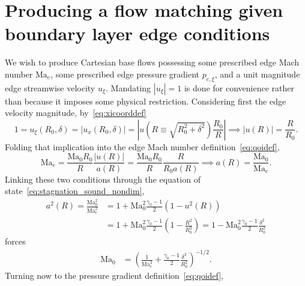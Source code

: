 \documentclass[letterpaper,11pt,nointlimits,reqno]{amsart}
\newcommand{\Mach}[1][]{\mbox{Ma}_{#1}}
\begin{document}
\section{Producing a flow matching given boundary layer edge conditions}

We wish to produce Cartesian base flows possessing some prescribed edge Mach
number $\Mach[e]{}$, some prescribed edge pressure gradient $p_{e,\xi}$, and a
unit magnitude edge streamwise velocity $u_\xi$.
%
Mandating $\left|u_\xi\right|=1$ is done for convenience rather than because it
imposes some physical restriction.
%
Considering first the edge velocity magnitude,
by~\eqref{eq:xicoorddef}
\begin{equation}
    1
    = u_\xi\!\left(R_0, \delta\right)
    = \left|u_x\!\left(R_0,\delta\right) \right|
    = \left|u  \!\left(R\equiv\sqrt{R_0^2+\delta^2}\right) \frac{R_0}{R} \right|
\implies
    \left|u\!\left(R\right)\right| = \frac{R}{R_0}
    \label{eq:matching_u}
.
\end{equation}
%
Folding that implication into the edge Mach number
definition~\eqref{eq:qoidef},
\begin{equation}
    \Mach[e]{}
    =
    \frac{\Mach[0]{} R_0}{R}
    \frac{\left|u\!\left(R\right)\right|}
         {      a\!\left(R\right)       }
    =
    \frac{\Mach[0]{} R_0}{R}
    \frac{R}{R_0 a\!\left(R\right)}
\implies
    a\!\left( R \right) = \frac{\Mach[0]}{\Mach[e]}
.
\end{equation}
%
Linking these two conditions through the equation of
state~\eqref{eq:stagnation_sound_nondim},
\begin{align}
    a^2\!\left(R\right)
    = \frac{\Mach[0]^2}{\Mach[e]^2}
   &= 1 + \Mach[0]^2\frac{\gamma_0-1}{2}\left(1-u^2\!\left(R\right)\right)
\\ &= 1 + \Mach[0]^2\frac{\gamma_0-1}{2}\left(1-\frac{R^2}{R_0^2}\right)
    = 1 - \Mach[0]^2\frac{\gamma_0-1}{2}\frac{\delta^2}{R_0^2}
\end{align}
forces
\begin{align}
    \Mach[0] &= \left(
        \frac{1}{\Mach[e]^2} + \frac{\gamma_0-1}{2}\frac{\delta^2}{R_0^2}
    \right)^{-1/2}
    \label{eq:matching_Ma0}
.
\end{align}
%
Turning now to the pressure gradient definition~\eqref{eq:qoidef},
\end{document}

